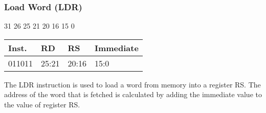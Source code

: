 \documentclass[12pt]{article}
\begin{document}

    \newpage
    \subsubsection{Load Word (LDR)}
    
    \hspace{1.6cm}31 \hspace{1.15cm}26 \hspace{.05cm}25 \hspace{.8cm}21 \hspace{.05cm}20 \hspace{.8cm}16 \hspace{.05cm}15 \hspace{6.4cm}0
    \vspace{-.25cm}
    \begin{center}
        \begin{tabular}{ |p{1.8cm}|p{1.5cm}|p{1.5cm}|p{6.8cm}| }
            \hline
            \textbf{Inst.} & \textbf{RD} &  \textbf{RS} & \textbf{Immediate}\\
            \hline
            011011& 25:21 & 20:16 &15:0\\
            \hline
        \end{tabular}
    \end{center}
    
    \noindent
    The LDR instruction is used to load a word from memory into a register RS. The address of the word that is fetched is calculated by adding the immediate value to the value of register RS. 
    
\end{document}
